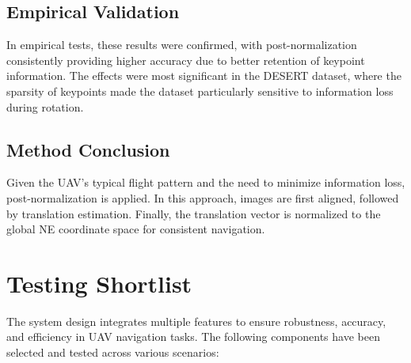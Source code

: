 \begin{enumerate}
\subsection*{Empirical Validation}

In empirical tests, these results were confirmed, with post-normalization consistently providing higher accuracy due to better retention of keypoint information. The effects were most significant in the DESERT dataset, where the sparsity of keypoints made the dataset particularly sensitive to information loss during rotation. 

\subsection*{Method Conclusion}

Given the UAV's typical flight pattern and the need to minimize information loss, post-normalization is applied. In this approach, images are first aligned, followed by translation estimation. Finally, the translation vector is normalized to the global NE coordinate space for consistent navigation.




\section{Testing Shortlist}

The system design integrates multiple features to ensure robustness, accuracy, and efficiency in UAV navigation tasks. The following components have been selected and tested across various scenarios:


\end{enumerate}
